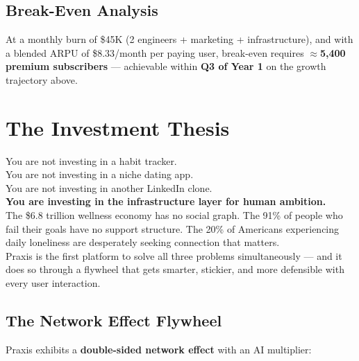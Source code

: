 \documentclass[11pt,a4paper]{article}
\begin{document}
\subsection{Break-Even Analysis}

At a monthly burn of \$45K (2 engineers + marketing + infrastructure), and with a blended ARPU of \$8.33/month per paying user, break-even requires \textbf{$\approx$5,400 premium subscribers} — achievable within \textbf{Q3 of Year 1} on the growth trajectory above.

\section{The Investment Thesis}

\begin{pitchbox}
\Large
You are not investing in a habit tracker.\\[6pt]
You are not investing in a niche dating app.\\[6pt]
You are not investing in another LinkedIn clone.\\[14pt]
\normalsize
\textbf{You are investing in the infrastructure layer for human ambition.}\\[10pt]
The \$6.8 trillion wellness economy has no social graph. The 91\% of people who fail their goals have no support structure. The 20\% of Americans experiencing daily loneliness are desperately seeking connection that matters.\\[10pt]
Praxis is the first platform to solve all three problems simultaneously — and it does so through a flywheel that gets smarter, stickier, and more defensible with every user interaction.
\end{pitchbox}

\subsection{The Network Effect Flywheel}

Praxis exhibits a \textbf{double-sided network effect} with an AI multiplier:
\end{document}
